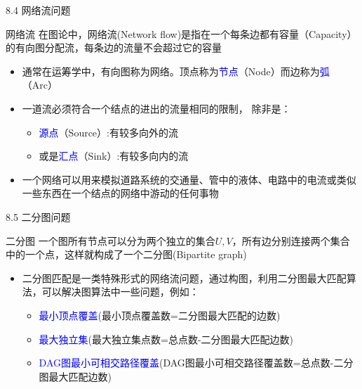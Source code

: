 \begin{frame}{8.4 网络流问题}
    \begin{block}{网络流}
        在图论中，网络流(Network flow)是指在一个每条边都有容量（Capacity）的有向图分配流，每条边的流量不会超过它的容量
    \end{block}
    \vfill
    \begin{itemize}
        \item 通常在运筹学中，有向图称为网络。顶点称为\textcolor{blue}{节点}（Node）而边称为\textcolor{blue}{弧}（Arc）
        \item 一道流必须符合一个结点的进出的流量相同的限制， 除非是：
        \begin{itemize}
            \item \textcolor{blue}{源点}（Source）:有较多向外的流
            \item 或是\textcolor{blue}{汇点}（Sink）:有较多向内的流
        \end{itemize}
        \item 一个网络可以用来模拟道路系统的交通量、管中的液体、电路中的电流或类似一些东西在一个结点的网络中游动的任何事物
    \end{itemize}
\end{frame}
\begin{frame}{8.5 二分图问题}
    \begin{block}{二分图}
        一个图所有节点可以分为两个独立的集合$U,V$，所有边分别连接两个集合中的一个点，这样就构成了一个二分图(Bipartite graph)
    \end{block}
    \begin{itemize}
        \item 二分图匹配是一类特殊形式的网络流问题，通过构图，利用二分图最大匹配算法，可以解决图算法中一些问题，例如：
        \vfill
        \begin{itemize}
            \item \textcolor{blue}{最小顶点覆盖}(最小顶点覆盖数=二分图最大匹配的边数)
            \item \textcolor{blue}{最大独立集}(最大独立集点数=总点数-二分图最大匹配边数)
            \item \textcolor{blue}{DAG图最小可相交路径覆盖}(DAG图最小可相交路径覆盖数=总点数-二分图最大匹配边数)
        \end{itemize} 
    \end{itemize}
\end{frame}
